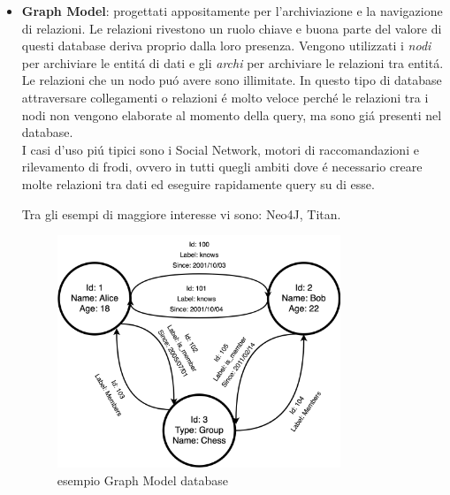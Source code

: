 \begin{itemize}
    \item \textbf{Graph Model}: progettati appositamente per l'archiviazione e la navigazione di relazioni. Le relazioni rivestono un ruolo chiave
    e buona parte del valore di questi database deriva proprio dalla loro presenza. Vengono utilizzati i \emph{nodi} per archiviare le entitá
    di dati e gli \emph{archi} per archiviare le relazioni tra entitá. Le relazioni che un nodo puó avere sono illimitate.
    In questo tipo di database attraversare collegamenti o relazioni é molto veloce perché le relazioni tra i nodi non vengono elaborate al momento
    della query, ma sono giá presenti nel database.\\
    I casi d'uso piú tipici sono i Social Network, motori di raccomandazioni e rilevamento di frodi, ovvero in tutti quegli ambiti dove é
    necessario creare molte relazioni tra dati ed eseguire rapidamente query su di esse.

    Tra gli esempi di maggiore interesse vi sono: Neo4J, Titan.
    \begin{figure}[H]
        \begin{center}
            \includegraphics[width=0.8\textwidth]{img/dbGrafo}
        \end{center}
    \caption{esempio Graph Model database}
    \end{figure}
\end{itemize}
